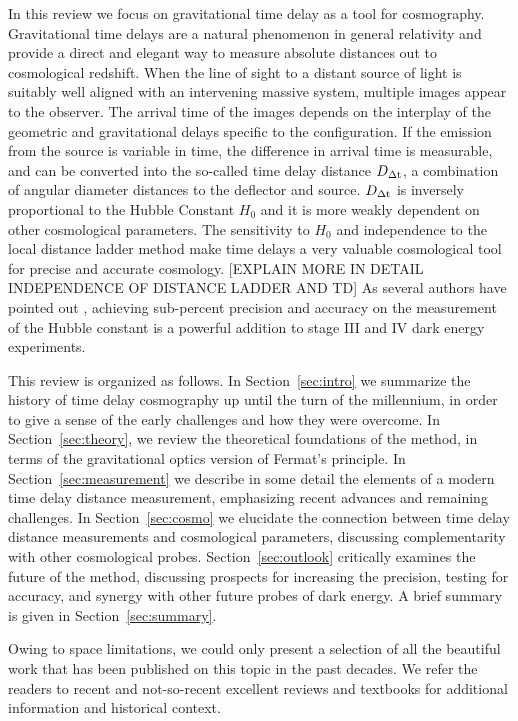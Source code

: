 In this review we focus on gravitational time delay as a tool for
cosmography.  Gravitational time delays are a natural phenomenon in
general relativity and provide a direct and elegant way to measure
absolute distances out to cosmological redshift. When the line of
sight to a distant source of light is suitably well aligned with an
intervening massive system, multiple images appear to the
observer. The arrival time of the images depends on the interplay of
the geometric and gravitational delays specific to the
configuration. If the emission from the source is variable in time,
the difference in arrival time is measurable, and can be converted
into the so-called time delay distance $D_{\Delta{\rm t}}$, a combination of
angular diameter distances to the deflector and source. $D_{\Delta{\rm t}}$ is
inversely proportional to the Hubble Constant $H_0$ and it is more
weakly dependent on other cosmological parameters. The sensitivity to
$H_0$ and independence to the local distance ladder method make time
delays a very valuable cosmological tool for precise and accurate
cosmology. [EXPLAIN MORE IN DETAIL INDEPENDENCE OF DISTANCE LADDER AND
TD] As several authors have pointed out
\citep{Lin11,Suy++12,Wei++13}, achieving sub-percent precision and
accuracy on the measurement of the Hubble constant is a powerful
addition to stage III and IV dark energy experiments.

This review is organized as follows. In Section~\ref{sec:intro} we
summarize the history of time delay cosmography up until the turn of
the millennium, in order to give a sense of the early challenges and
how they were overcome. In Section~\ref{sec:theory}, we review the
theoretical foundations of the method, in terms of the gravitational
optics version of Fermat's principle. In Section~\ref{sec:measurement}
we describe in some detail the elements of a modern time delay
distance measurement, emphasizing recent advances and remaining
challenges. In Section~\ref{sec:cosmo} we elucidate the connection
between time delay distance measurements and cosmological parameters,
discussing complementarity with other cosmological
probes. Section~\ref{sec:outlook} critically examines the future of
the method, discussing prospects for increasing the precision, testing
for accuracy, and synergy with other future probes of dark energy. A
brief summary is given in Section~\ref{sec:summary}. 

Owing to space limitations, we could only present a selection of all
the beautiful work that has been published on this topic in the past
decades. We refer the readers to recent
\citep{Bar10,Ell10,Tre10,TMC12,Jackson:2013p30763,Jac15,T+E15} and not-so-recent \citep{B+N92,CSS02,K+S04,Fal05,SKW06}
excellent reviews and textbooks \citep{SEF92} for additional
information and historical context.

